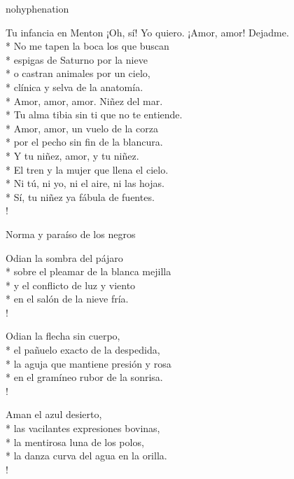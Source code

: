 \documentclass[
    a5paper,
    DIV=10,
    12pt,
    notitlepage,
    oneside,]
{scrbook} %
\begin{document}
\begin{hyphenrules}{nohyphenation}
\begin{poem}{Tu infancia en Menton}{}{}
¡Oh, sí! Yo quiero. ¡Amor, amor! Dejadme.\\*
No me tapen la boca los que buscan\\*
espigas de Saturno por la nieve\\*
o castran animales por un cielo,\\*
clínica y selva de la anatomía.\\*
Amor, amor, amor. Niñez del mar.\\*
Tu alma tibia sin ti que no te entiende.\\*
Amor, amor, un vuelo de la corza\\*
por el pecho sin fin de la blancura.\\*
Y tu niñez, amor, y tu niñez.\\*
El tren y la mujer que llena el cielo.\\*
Ni tú, ni yo, ni el aire, ni las hojas.\\*
Sí, tu niñez ya fábula de fuentes.\\!

\end{poem}




\begin{poem}{Norma y paraíso de los negros}{}{\vspace{-1em}}

Odian la sombra del pájaro\\*
sobre el pleamar de la blanca mejilla\\*
y el conflicto de luz y viento\\*
en el salón de la nieve fría.\\!

Odian la flecha sin cuerpo,\\*
el pañuelo exacto de la despedida,\\*
la aguja que mantiene presión y rosa\\*
en el gramíneo rubor de la sonrisa.\\!

Aman el azul desierto,\\*
las vacilantes expresiones bovinas,\\*
la mentirosa luna de los polos,\\*
la danza curva del agua en la orilla.\\!


\end{poem}
\end{hyphenrules}
\end{document}
